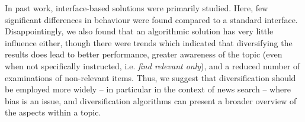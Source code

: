 In past work, interface-based solutions were primarily studied. Here, few significant differences in behaviour were found compared to a standard interface. Disappointingly, we also found that an algorithmic solution has very little influence either, though there were trends which indicated that diversifying the results does lead to better performance, greater awareness of the topic (even when not specifically instructed, i.e. \textit{find relevant only}), and a reduced number of examinations of non-relevant items. Thus, we suggest that diversification should be employed more widely -- in particular in the context of news search -- where bias is an issue, and diversification algorithms can present a broader overview of the aspects within a topic. 



